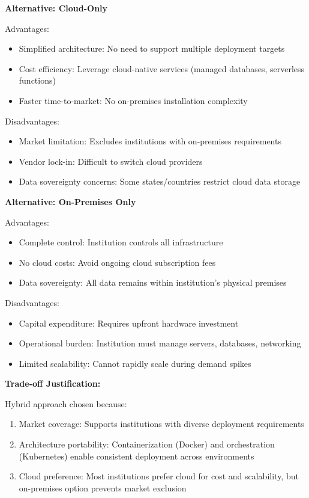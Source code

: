 \textbf{Alternative: Cloud-Only}

Advantages:
\begin{itemize}
\item Simplified architecture: No need to support multiple deployment targets
\item Cost efficiency: Leverage cloud-native services (managed databases, serverless functions)
\item Faster time-to-market: No on-premises installation complexity
\end{itemize}

Disadvantages:
\begin{itemize}
\item Market limitation: Excludes institutions with on-premises requirements
\item Vendor lock-in: Difficult to switch cloud providers
\item Data sovereignty concerns: Some states/countries restrict cloud data storage
\end{itemize}

\textbf{Alternative: On-Premises Only}

Advantages:
\begin{itemize}
\item Complete control: Institution controls all infrastructure
\item No cloud costs: Avoid ongoing cloud subscription fees
\item Data sovereignty: All data remains within institution's physical premises
\end{itemize}

Disadvantages:
\begin{itemize}
\item Capital expenditure: Requires upfront hardware investment
\item Operational burden: Institution must manage servers, databases, networking
\item Limited scalability: Cannot rapidly scale during demand spikes
\end{itemize}

\textbf{Trade-off Justification:}

Hybrid approach chosen because:
\begin{enumerate}
\item Market coverage: Supports institutions with diverse deployment requirements
\item Architecture portability: Containerization (Docker) and orchestration (Kubernetes) enable consistent deployment across environments
\item Cloud preference: Most institutions prefer cloud for cost and scalability, but on-premises option prevents market exclusion
\end{enumerate}

